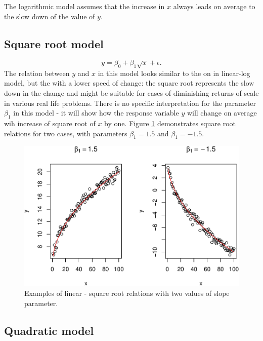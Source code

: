 \documentclass[
]{book}
\theoremstyle{definition}
\theoremstyle{definition}
\theoremstyle{definition}
\theoremstyle{definition}
\theoremstyle{remark}
\begin{document}
The logarithmic model assumes that the increase in \(x\) always leads on average to the slow down of the value of \(y\).

\subsection{Square root model}\label{square-root-model}

\begin{equation}
    y = \beta_0 + \beta_1 \sqrt x + \epsilon .
    \label{eq:transformSqrt}
\end{equation}
The relation between \(y\) and \(x\) in this model looks similar to the on in linear-log model, but the with a lower speed of change: the square root represents the slow down in the change and might be suitable for cases of diminishing returns of scale in various real life problems. There is no specific interpretation for the parameter \(\beta_1\) in this model - it will show how the response variable \(y\) will change on average wih increase of square root of \(x\) by one. Figure \ref{fig:transformationsExamples04} demonstrates square root relations for two cases, with parameters \(\beta_1=1.5\) and \(\beta_1=-1.5\).

\begin{figure}
\centering
\includegraphics{Svetunkov---Statistics-for-Business-Analytics_files/figure-latex/transformationsExamples04-1.pdf}
\caption{\label{fig:transformationsExamples04}Examples of linear - square root relations with two values of slope parameter.}
\end{figure}

\subsection{Quadratic model}\label{quadratic-model}
\end{document}

